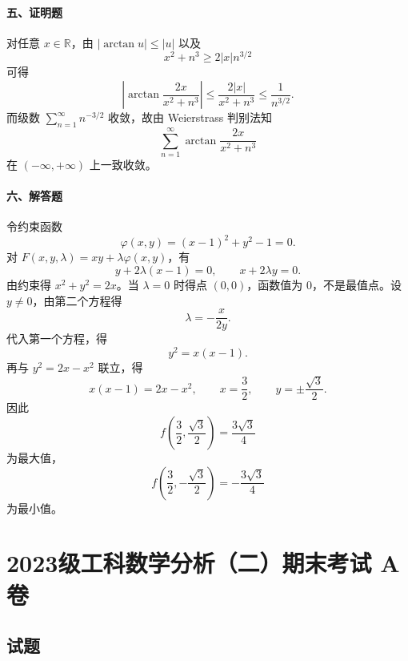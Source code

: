 \paragraph*{五、证明题}
对任意 $x\in\mathbb R$，由 $|\arctan u|\le |u|$ 以及
\[
  x^2+n^3\ge 2|x|n^{3/2}
\]
可得
\[
  \left|\arctan\frac{2x}{x^2+n^3}\right|
  \le
  \frac{2|x|}{x^2+n^3}
  \le
  \frac1{n^{3/2}}.
\]
而级数 $\sum_{n=1}^{\infty}n^{-3/2}$ 收敛，故由 Weierstrass 判别法知
\[
  \sum_{n=1}^{\infty}\arctan\frac{2x}{x^2+n^3}
\]
在 $(-\infty,+\infty)$ 上一致收敛。

\paragraph*{六、解答题}
令约束函数
\[
  \varphi(x,y)=(x-1)^2+y^2-1=0.
\]
对 $F(x,y,\lambda)=xy+\lambda\varphi(x,y)$，有
\[
  y+2\lambda(x-1)=0,\qquad x+2\lambda y=0.
\]
由约束得 $x^2+y^2=2x$。当 $\lambda=0$ 时得点 $(0,0)$，函数值为 $0$，不是最值点。设 $y\ne0$，由第二个方程得
\[
  \lambda=-\frac{x}{2y}.
\]
代入第一个方程，得
\[
  y^2=x(x-1).
\]
再与 $y^2=2x-x^2$ 联立，得
\[
  x(x-1)=2x-x^2,\qquad x=\frac32,\qquad y=\pm\frac{\sqrt3}{2}.
\]
因此
\[
  f\left(\frac32,\frac{\sqrt3}{2}\right)=\frac{3\sqrt3}{4}
  \]
为最大值，
\[
  f\left(\frac32,-\frac{\sqrt3}{2}\right)=-\frac{3\sqrt3}{4}
  \]
为最小值。

\section{2023级工科数学分析（二）期末考试 A 卷}

\subsection{试题}

